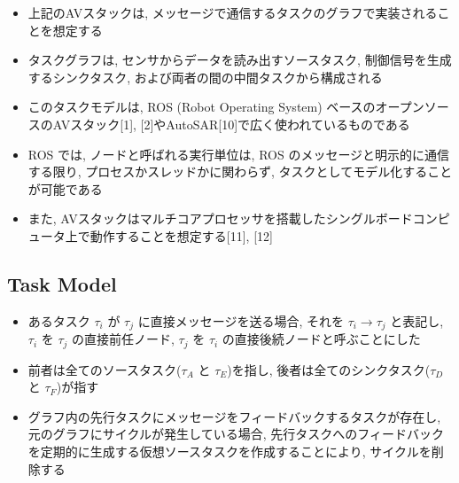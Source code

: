 \begin{frame}{}
    \begin{itemize}
        \item 上記のAVスタックは, メッセージで通信するタスクのグラフで実装されることを想定する
        \item タスクグラフは, センサからデータを読み出すソースタスク, 制御信号を生成するシンクタスク, および両者の間の中間タスクから構成される
        \item このタスクモデルは, ROS (Robot Operating System) ベースのオープンソースのAVスタック[1], [2]やAutoSAR[10]で広く使われているものである
        \item ROS では, ノードと呼ばれる実行単位は, ROS のメッセージと明示的に通信する限り, プロセスかスレッドかに関わらず, タスクとしてモデル化することが可能である
        \item また, AVスタックはマルチコアプロセッサを搭載したシングルボードコンピュータ上で動作することを想定する[11], [12]
    \end{itemize}
\end{frame}


\subsection{Task Model}
\label{ssec: task model}

\begin{frame}{}
\end{frame}

\begin{frame}{}
    \begin{itemize}
        \item あるタスク $\tau_{i}$ が $\tau_{j}$ に直接メッセージを送る場合, それを $\tau_{i} \rightarrow \tau_{j}$ と表記し, $\tau_{i}$ を $\tau_{j}$ の直接前任ノード, $\tau_{j}$ を $\tau_{i}$ の直接後続ノードと呼ぶことにした
        \item 前者は全てのソースタスク($\tau_{A}$ と $\tau_{E}$)を指し, 後者は全てのシンクタスク($\tau_{D}$ と $\tau_{F}$)が指す
        \item グラフ内の先行タスクにメッセージをフィードバックするタスクが存在し, 元のグラフにサイクルが発生している場合, 先行タスクへのフィードバックを定期的に生成する仮想ソースタスクを作成することにより, サイクルを削除する
    \end{itemize}
\end{frame}

